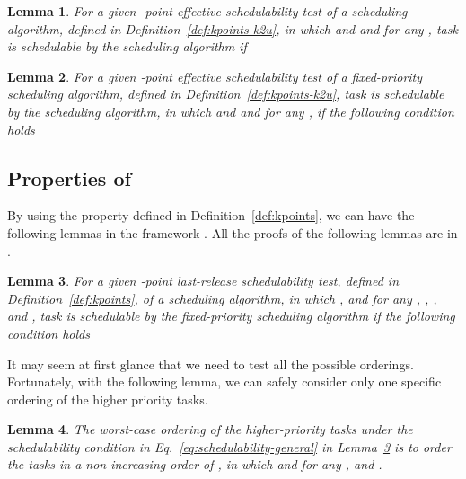 \documentclass[10pt,conference]{IEEEtran}
\newcommand{\frameworkkq}[1]{}
\newtheorem{lemma}{Lemma}
\begin{document}
\begin{lemma}
\label{lemma:framework-totalU-exclusive-k2u}
For a given -point effective schedulability test of a scheduling
algorithm, defined in
Definition~\ref{def:kpoints-k2u},
in which  and  and  for any
, task  is schedulable by the scheduling
algorithm if 

\end{lemma}



\begin{lemma}
\label{lemma:framework-general-k2u}
For a given -point effective schedulability test of a fixed-priority scheduling
algorithm, defined in
Definition~\ref{def:kpoints-k2u}, task  is schedulable by the scheduling algorithm,
in which  and  and  for any
, 
 if
the following condition holds 

\end{lemma}

\subsection{Properties of \frameworkkq{}}
By using the property defined in Definition~\ref{def:kpoints}, we
can have the following lemmas in the \frameworkkq{} framework
\cite{DBLP:journals/corr/abs-kRTA,DBLP:conf/rtss/ChenHL16}.
All the proofs of the
following lemmas are in
\cite{DBLP:journals/corr/abs-kRTA,DBLP:conf/rtss/ChenHL16}.

  
\begin{lemma}
\label{lemma:framework-general-schedulability}
For a given -point last-release schedulability test, defined in
Definition~\ref{def:kpoints}, of a scheduling 
algorithm,
in which , and  for any
, , , and , task  is schedulable by the
fixed-priority scheduling
algorithm if the following condition holds

\end{lemma}

It may seem at first glance that we need to test all the possible
orderings. Fortunately, with the following lemma, we can safely
consider only one specific ordering of the  higher priority
tasks.
\begin{lemma}
  \label{lemma:general-sorting}
  The worst-case ordering  of the  higher-priority tasks under the schedulability condition in Eq.~\eqref{eq:schedulability-general} in Lemma~\ref{lemma:framework-general-schedulability} is to order the tasks in a non-increasing order of ,
 in which  and  for any , and .
\end{lemma}
\end{document}
